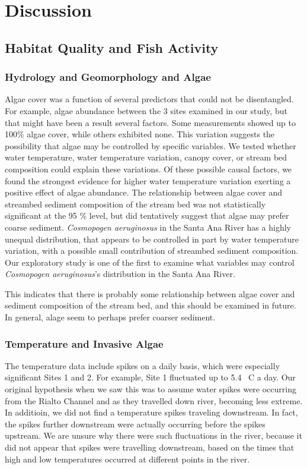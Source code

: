 \documentclass{article}\usepackage[]{graphicx}\usepackage[]{color}
\begin{document}
\section{Discussion}

\subsection{Habitat Quality and Fish Activity}

\subsubsection{Hydrology and Geomorphology and Algae}

Algae cover was a function of several predictors that could not be disentangled. For example, algae abundance between the 3 sites examined in our study, but that might have been a result several factors. Some measurements showed up to 100\% algae cover, while others exhibited none. This variation suggests the possibility that algae may be controlled by specific variables. We tested whether water temperature, water temperature variation, canopy cover, or stream bed composition could explain these variations. Of these possible causal factors, we found the strongest evidence for higher water temperature variation exerting a positive effect of algae abundance. The relationship between algae cover and streambed sediment composition of the stream bed was not statistically significant at the 95 \% level, but did tentatively suggest that algae may prefer coarse sediment. \emph{Cosmopogen aeruginosus} in the Santa Ana River has a highly unequal distribution, that appears to be controlled in part by water temperature variation, with a possible small contribution of streambed sediment composition. 
Our exploratory study is one of the first to examine what variables may control \emph{Cosmopogen aeruginosus}'s distribution in the Santa Ana River. 

This indicates that there is probably some relationship between algae cover and sediment composition of the stream bed, and this should be examined in future. In general, alage seem to perhaps prefer coarser sediment. 

\subsubsection{Temperature and Invasive Algae}

The temperature data include spikes on a daily basis, which were especially significant Sites 1 and 2. For example, Site 1 fluctuated up to 5.4 \textdegree~C a day. Our original hypothesis when we saw this was to assume water spikes were occurring from the Rialto Channel and as they travelled down river, becoming less extreme. In additioin, we did not find a temperature spikes traveling downstream. In fact, the spikes further downstream were actually occurring before the spikes upstream. We are unsure why there were such fluctuations in the river, because it did not appear that spikes were travelling downstream, based on the times that high and low temperatures occurred at different points in the river. 
\end{document}
